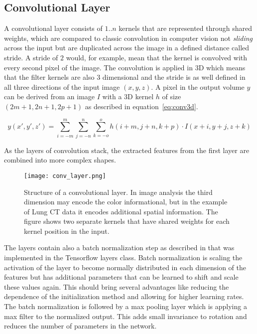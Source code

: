 \documentclass[main.tex]{subfiles}
\begin{document}
\subsection{Convolutional Layer}\label{ss:convlayer}
A convolutional layer consists of $1..n$ kernels that are represented through shared weights, which are compared to classic convolution in computer vision not \emph{sliding} across the input but are duplicated across the image in a defined distance called stride. A stride of $2$ would, for example, mean that the kernel is convolved with every second pixel of the image. The convolution is applied in 3D which means that the filter kernels are also 3 dimensional and the stride is as well defined in all three directions of the input image $(x,y,z)$. A pixel in the output volume $y$ can be derived from an image $I$ with a 3D kernel $h$ of size $(2m+1,2n+1,2p+1)$ as described in equation~\eqref{eq:conv3d}.

\begin{equation}
y(x',y',z')=\sum_{i = -m}^{m}\sum_{j = -n}^{n}\sum_{k=-o}^{o} h(i+m,j+n,k+p) \cdot I(x+i,y+j,z+k) 
\label{eq:conv3d}
\end{equation}
 
As the layers of convolution stack, the extracted features from the first layer are combined into more complex shapes.

\begin{figure}
\begin{center}
\texttt{[image: conv\_layer.png]}
\end{center}
\caption{Structure of a convolutional layer. In image analysis the third dimension may encode the color informational, but in the example of Lung CT data it encodes additional spatial information. The figure shows two separate kernels that have shared weights for each kernel position in the input.}
\label{fig:conv_layer}
\end{figure}

The layers contain also a batch normalization step as described in \cite{ioffe2015batch} that was implemented in the Tensorflow layers class. Batch normalization is scaling the activation of the layer to become normally distributed in each dimension of the features but has additional parameters that can be learned to shift and scale these values again. This should bring several advantages like reducing the dependence of the initialization method and allowing for higher learning rates. The batch normalization is followed by a max pooling layer which is applying a max filter to the normalized output. This adds small invariance to rotation and reduces the number of parameters in the network.
\end{document}
